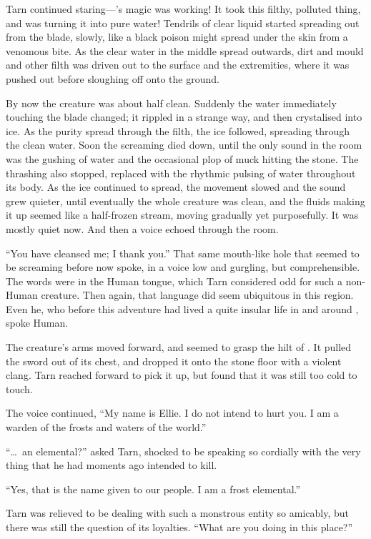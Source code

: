 Tarn continued staring---\kildir's magic was working!  It took this filthy, polluted thing, and was turning it into pure water!  Tendrils of clear liquid started spreading out from the blade, slowly, like a black poison might spread under the skin from a venomous bite.  As the clear water in the middle spread outwards, dirt and mould and other filth was driven out to the surface and the extremities, where it was pushed out before sloughing off onto the ground.

By now the creature was about half clean.  Suddenly the water immediately touching the blade changed; it rippled in a strange way, and then crystalised into ice.  As the purity spread through the filth, the ice followed, spreading through the clean water.  Soon the screaming died down, until the only sound in the room was the gushing of water and the occasional plop of muck hitting the stone.  The thrashing also stopped, replaced with the rhythmic pulsing of water throughout its body.  As the ice continued to spread, the movement slowed and the sound grew quieter, until eventually the whole creature was clean, and the fluids making it up seemed like a half-frozen stream, moving gradually yet purposefully.  It was mostly quiet now.  And then a voice echoed through the room.

``You have cleansed me; I thank you.''  That same mouth-like hole that seemed to be screaming before now spoke, in a voice low and gurgling, but comprehensible.  The words were in the Human tongue, which Tarn considered odd for such a non-Human creature.  Then again, that language did seem ubiquitous in this region.  Even he, who before this adventure had lived a quite insular life in and around \korbarthrond, spoke Human.

The creature's arms moved forward, and seemed to grasp the hilt of \kildir.  It pulled the sword out of its chest, and dropped it onto the stone floor with a violent clang.  Tarn reached forward to pick it up, but found that it was still too cold to touch.

The voice continued, ``My name is Ellie. I do not intend to hurt you.  I am a warden of the frosts and waters of the world.''

``\ldots\ an elemental?'' asked Tarn, shocked to be speaking so cordially with the very thing that he had moments ago intended to kill.

``Yes, that is the name given to our people.  I am a frost elemental.''

Tarn was relieved to be dealing with such a monstrous entity so amicably, but there was still the question of its loyalties. ``What are you doing in this place?''  

